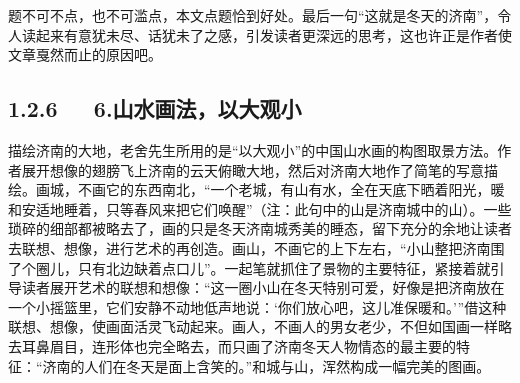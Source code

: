 \documentclass[letterpaper,10pt,english]{sphinxmanual}
\begin{document}
题不可不点，也不可滥点，本文点题恰到好处。最后一句“这就是冬天的济南”，令人读起来有意犹未尽、话犹未了之感，引发读者更深远的思考，这也许正是作者使文章戛然而止的原因吧。


\subsection{1.2.6   6.山水画法，以大观小}
\label{\detokenize{p01_u6563_u6587/_u8001_u820d-_u6d4e_u5357_u7684_u51ac_u5929:id10}}
描绘济南的大地，老舍先生所用的是“以大观小”的中国山水画的构图取景方法。作者展开想像的翅膀飞上济南的云天俯瞰大地，然后对济南大地作了简笔的写意描绘。画城，不画它的东西南北，“一个老城，有山有水，全在天底下晒着阳光，暖和安适地睡着，只等春风来把它们唤醒”（注：此句中的山是济南城中的山）。一些琐碎的细部都被略去了，画的只是冬天济南城秀美的睡态，留下充分的余地让读者去联想、想像，进行艺术的再创造。画山，不画它的上下左右，“小山整把济南围了个圈儿，只有北边缺着点口儿”。一起笔就抓住了景物的主要特征，紧接着就引导读者展开艺术的联想和想像：“这一圈小山在冬天特别可爱，好像是把济南放在一个小摇篮里，它们安静不动地低声地说：‘你们放心吧，这儿准保暖和。’”借这种联想、想像，使画面活灵飞动起来。画人，不画人的男女老少，不但如国画一样略去耳鼻眉目，连形体也完全略去，而只画了济南冬天人物情态的最主要的特征：“济南的人们在冬天是面上含笑的。”和城与山，浑然构成一幅完美的图画。
\end{document}
